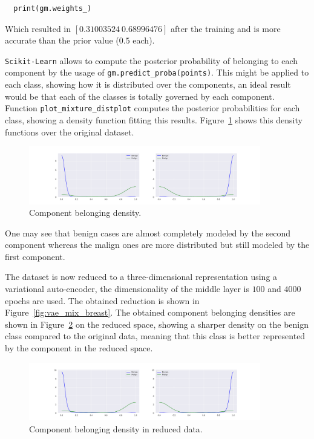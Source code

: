 \begin{verbatim}
  print(gm.weights_)
\end{verbatim}

Which resulted in \([0.31003524\ 0.68996476]\) after the training and is more accurate than the prior value (\(0.5\) each).

\texttt{Scikit-Learn} allows to compute the posterior probability of belonging to each component by the usage of \texttt{gm.predict\_proba(points)}. This might be applied to each class, showing how it is distributed over the components, an ideal result would be that each of the classes is totally governed by each component. Function \texttt{plot\_mixture\_distplot} computes the posterior probabilities for each class, showing a density function fitting this results. Figure~\ref{fig:proba_ob} shows this density functions over the original dataset.

\begin{figure}[h!]
  \centering
  \includegraphics[width=0.9\textwidth]{tex/images/proba_observed.pdf}
  \caption{Component belonging density.}\label{fig:proba_ob}
\end{figure}

One may see that benign cases are almost completely modeled by the second component whereas the malign ones are more distributed but still modeled by the first component.

The dataset is now reduced to a three-dimensional representation using a variational auto-encoder, the dimensionality of the middle layer is \(100\) and \(4000\) epochs are used. The obtained reduction is shown in Figure~\ref{fig:vae_mix_breast}. The obtained component belonging densities are shown in
Figure~\ref{fig:proba_red} on the reduced space, showing a sharper density on the benign class compared to the original data, meaning that this class is better represented by the component in the reduced space.

\begin{figure}[h!]
    \centering
    \includegraphics[width=0.9\textwidth]{tex/images/proba_reduced.pdf}
    \caption{Component belonging density in reduced data.}\label{fig:proba_red}
\end{figure}



